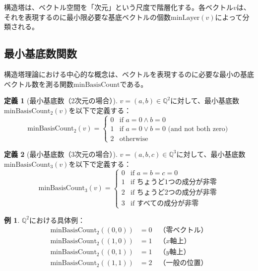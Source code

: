 \documentclass[11pt,a4paper]{ltjsarticle}
\theoremstyle{definition}
\newtheorem{definition}{定義}[section]
\newtheorem{example}{例}[section]
\newcommand{\Q}{\mathbb{Q}}
\newcommand{\minLayer}{\mathrm{minLayer}}
\newcommand{\minBasis}{\mathrm{minBasisCount}}
\begin{document}
\begin{tcolorbox}[colback=blue!5!white,colframe=blue!75!black,title=数学的直観]
構造塔は、ベクトル空間を「次元」という尺度で階層化する。各ベクトル$v$は、それを表現するのに最小限必要な基底ベクトルの個数$\minLayer(v)$によって分類される。
\end{tcolorbox}

\subsection{最小基底数関数}

構造塔理論における中心的な概念は、ベクトルを表現するのに必要な最小の基底ベクトル数を測る関数$\minBasis$である。

\begin{definition}[最小基底数（2次元の場合）]
\label{def:min_basis_count_2}
$v = (a, b) \in \Q^2$に対して、最小基底数$\minBasis_2(v)$を以下で定義する：
\[
\minBasis_2(v) = \begin{cases}
0 & \text{if } a = 0 \land b = 0 \\
1 & \text{if } a = 0 \lor b = 0 \text{ (and not both zero)} \\
2 & \text{otherwise}
\end{cases}
\]
\end{definition}

\begin{definition}[最小基底数（3次元の場合）]
\label{def:min_basis_count_3}
$v = (a, b, c) \in \Q^3$に対して、最小基底数$\minBasis_3(v)$を以下で定義する：
\[
\minBasis_3(v) = \begin{cases}
0 & \text{if } a = b = c = 0 \\
1 & \text{if ちょうど1つの成分が非零} \\
2 & \text{if ちょうど2つの成分が非零} \\
3 & \text{if すべての成分が非零}
\end{cases}
\]
\end{definition}

\begin{example}
$\Q^2$における具体例：
\begin{align*}
\minBasis_2((0, 0)) &= 0 \quad \text{（零ベクトル）} \\
\minBasis_2((1, 0)) &= 1 \quad \text{（$x$軸上）} \\
\minBasis_2((0, 1)) &= 1 \quad \text{（$y$軸上）} \\
\minBasis_2((1, 1)) &= 2 \quad \text{（一般の位置）}
\end{align*}
\end{example}
\end{document}
